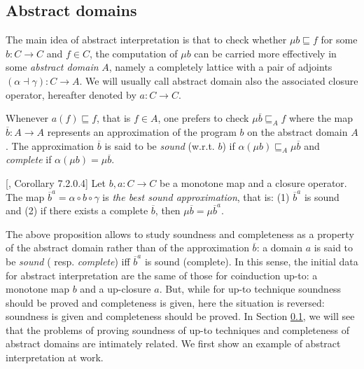 \documentclass{llncs}
\begin{document}
\subsection{Abstract domains}
The main idea of abstract interpretation is that to check whether  $\mu b\sqsubseteq f$ for some $b\colon C \to C$ and $f\in C$, the computation of $\mu b$ can be carried more effectively in some \emph{abstract domain} $A$, namely a completely lattice with a pair of adjoints $(\alpha \dashv \gamma) \colon C \to A$. We will usually call abstract domain also the associated  closure operator, hereafter denoted by $a\colon C \to C$. 

Whenever $a(f)\sqsubseteq f$, that is $f\in A$, one prefers to check  $\mu \overline{b}\sqsubseteq_A f$ where the map $\overline{b}\colon A\to A$ represents an approximation of the  program $b$ on the abstract domain $A$.
The approximation $\overline{b}$ is said to be \emph{sound} (w.r.t. $b$) if
$\alpha(\mu b) \sqsubseteq_A \mu \overline{b}$ and \emph{complete} if
$\alpha(\mu b) = \mu \overline{b}$.

\begin{proposition}\label{prop:alwayssound}[\cite{cousot1979systematic}, Corollary 7.2.0.4]
Let $b,a\colon C \to C$ be a monotone map and a closure operator. 
The map $\overline{b}^a = \alpha \circ b \circ \gamma $ is \emph{the best sound approximation}, that is: (1) $\overline{b}^a$ is sound and (2) if there exists a complete $\overline{b}$, then $\mu \overline{b} = \mu \overline{b}^a$.
\end{proposition}
The above proposition allows to study soundness and completeness as a property of the abstract domain rather than of the approximation $\overline{b}$: a domain $a$ is said to be \emph{sound} ( resp. \emph{complete}) iff $\overline{b}^a$ is sound (complete). In this sense, the initial data for abstract interpretation are the same of those for coinduction up-to: a monotone map $b$ and a up-closure $a$. But, while for up-to technique soundness should be proved and completeness is given, here the situation is reversed: soundness is given and completeness should be proved. In Section \ref{}, we will see that the problems of proving soundness of up-to techniques and completeness of abstract domains are intimately related. We first show an example of abstract interpretation at work.
\end{document}
